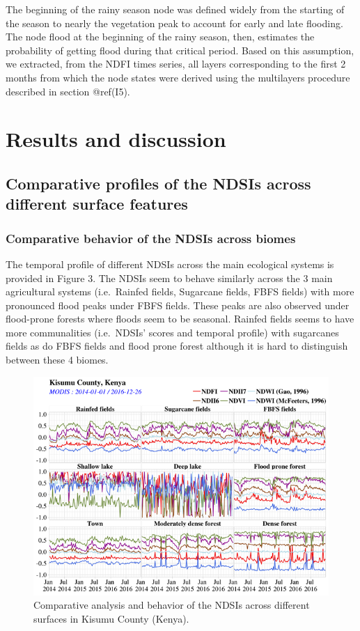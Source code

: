 \documentclass[12pt,oneside]{article}
\begin{document}
The beginning of the rainy season node was defined widely from the starting of the season to nearly the vegetation peak to account for early and late flooding. The node flood at the beginning of the rainy season, then, estimates the probability of getting flood during that critical period. Based on this assumption, we extracted, from the NDFI times series, all layers corresponding to the first 2 months from which the node states were derived using the multilayers procedure described in section @ref(I5).

\hypertarget{II}{%
\section{Results and discussion}\label{II}}

\hypertarget{II1}{%
\subsection{Comparative profiles of the NDSIs across different surface features}\label{II1}}

\hypertarget{II11}{%
\subsubsection{Comparative behavior of the NDSIs across biomes}\label{II11}}

The temporal profile of different NDSIs across the main ecological systems is provided in Figure 3. The NDSIs seem to behave similarly across the 3 main agricultural systems (i.e.~Rainfed fields, Sugarcane fields, FBFS fields) with more pronounced flood peaks under FBFS fields. These peaks are also observed under flood-prone forests where floods seem to be seasonal. Rainfed fields seems to have more communalities (i.e.~NDSIs' scores and temporal profile) with sugarcanes fields as do FBFS fields and flood prone forest although it is hard to distinguish between these 4 biomes.

\begin{figure}
\includegraphics[width=1\linewidth]{figures/Mapping_FBFS_ndsi_comparaison} \caption{Comparative analysis and behavior of the NDSIs across different surfaces in Kisumu County (Kenya).}\label{fig:fig3}
\end{figure}
\end{document}
